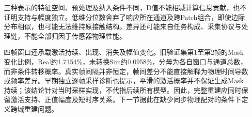 三种表示的特征空间、预处理及纳入条件不同，D值不能相减计算信息贡献，也不证明支持与幅度独立。低维分位数舍弃了响应所在通道及跨Patch组合，即使边际分布相似，也可能无法维持原接触结构。差异还可能来自任务构成、采集协议与处理链，不能全部归因于传感器物理性能。

四帧窗口还承载激活持续、出现、消失及幅值变化。旧验证集第1至第2帧的Mask变化比例，Real约1.7154\%，未转换Sim约0.0958\%，分母为各自窗口与通道总数，而非条件转移概率。真实帧间隔并非恒定，帧间差分不能直接解释为物理时间导数或频率差异。早期独立逐帧采样诊断也提示，平滑的激活概率并不保证生成Mask持续；该结论针对当时采样实现，不代指后续所有模型。因此，完整重建应同时保留激活支持、正值幅度及短时序关系。下一节据此在缺少同步物理配对的条件下定义跨域重建问题。
